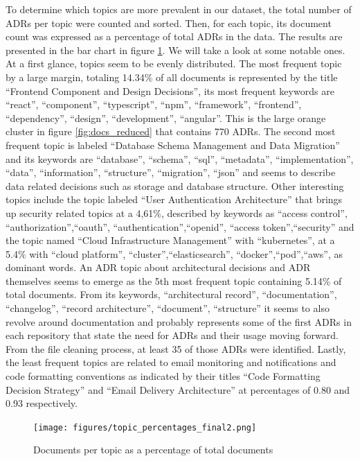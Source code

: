         To determine which topics are more prevalent in our dataset, the total number of ADRs per topic were counted and sorted. Then, for each topic, its document count was expressed as a percentage of total ADRs in the data. The results are presented in the bar chart in figure \ref{fig:docs_per_topic_percentage}. We will take a look at some notable ones. At a first glance, topics seem to be evenly distributed. The most frequent topic by a large margin, totaling 14.34\% of all documents is represented by the title ``Frontend Component and Design Decisions'', its most frequent keywords are ``react'', ``component'', ``typescript'', ``npm'', ``framework'', ``frontend'', ``dependency'', ``design'', ``development'', ``angular''. This is the large orange cluster in figure \ref{fig:docs_reduced} that contains 770 ADRs. The second most frequent topic is labeled ``Database Schema Management and Data Migration'' and its keywords are ``database'', ``schema'', ``sql'', ``metadata'', ``implementation'', ``data'', ``information'', ``structure'', ``migration'', ``json'' and seems to describe data related decisions such as storage and database structure. Other interesting topics include the topic labeled ``User Authentication Architecture'' that brings up security related topics at a 4,61\%, described by keywords as ``access control'', ``authorization'',``oauth'', ``authentication'',``openid'', ``access token'',``security'' and the topic named ``Cloud Infrastructure Management'' with ``kubernetes'', at a 5.4\% with ``cloud platform'', ``cluster'',``elasticsearch'', ``docker'',``pod'',``aws'', as dominant words. An ADR topic about architectural decisions and ADR themselves seems to emerge as the 5th most frequent topic containing 5.14\% of total documents. From its keywords, ``architectural record'', ``documentation'', ``changelog'', ``record architecture'', ``document'', ``structure'' it seems to also revolve around documentation and probably represents some of the first ADRs in each repository that state the need for ADRs and their usage moving forward. From the file cleaning process, at least 35 of those ADRs were identified. Lastly, the least frequent topics are related to email monitoring and notifications and code formatting conventions as indicated by their titles ``Code Formatting Decision Strategy'' and ``Email Delivery Architecture'' at percentages of 0.80 and 0.93 respectively. 

        \begin{figure}[h!]
            \centering
            \hspace*{-2,8cm} 
            \texttt{[image: figures/topic\_percentages\_final2.png]}
            \caption{Documents per topic as a percentage of total documents}
            \label{fig:docs_per_topic_percentage}
        \end{figure}

